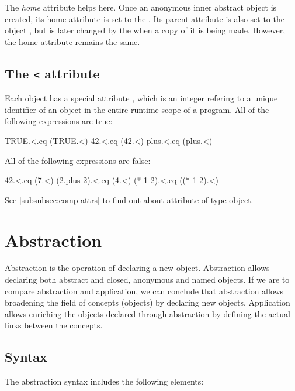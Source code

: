 \documentclass[12pt]{book}
\begin{document}
The \textit{home} attribute \ff{&} helps here. Once an anonymous inner abstract object is created, its home attribute is set to the . Its parent attribute \ff{^} is also set to the object , but is later changed by the  when a copy of it is being made. However, the home attribute remains the same.

\subsection{The \texttt{<} attribute}
Each object has a special attribute \ff{<}, which is an integer refering to a unique identifier of an object in the entire runtime scope of a program. All of the following expressions are true:
\begin{ffcode}
TRUE.<.eq (TRUE.<)
42.<.eq (42.<)
plus.<.eq (plus.<)
\end{ffcode}
All of the following expressions are false:
\begin{ffcode}
42.<.eq (7.<)
(2.plus 2).<.eq (4.<)
(* 1 2).<.eq ((* 1 2).<)
\end{ffcode}
See \ref{subsubsec:comp-attrs} to find out about  attribute of  type object.

\section{Abstraction} \label{sec:abstracion}
Abstraction is the operation of declaring a new object. Abstraction allows declaring both abstract and closed, anonymous and named objects.
If we are to compare abstraction and application, we can conclude that abstraction allows broadening the field of concepts (objects) by declaring new objects. Application allows enriching the objects declared through abstraction by defining the actual links between the concepts.

\subsection{Syntax}
The abstraction syntax includes the following elements:
\end{document}
